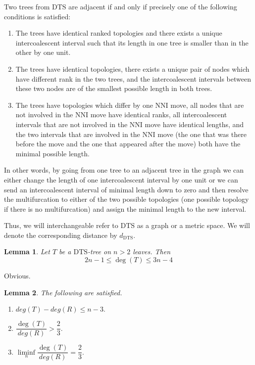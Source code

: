 \documentclass{amsart}
\newtheorem{lemma}{Lemma}
\newcommand{\dts}{\mathrm{DTS}}
\begin{document}
Two trees from $\dts$ are adjacent if and only if precisely one of the following
conditions is satisfied: 

\begin{enumerate}[(1)]
\item The trees have identical ranked topologies and there exists a unique
intercoalescent interval such that its length in one tree is smaller than in the
other by one unit. 
\item The trees have identical topologies, there exists a unique pair of nodes
which have different rank in the two trees, and the intercoalescent intervals 
between these two nodes are of the smallest possible length in both trees. 
\item The trees have topologies which differ by one NNI move, all nodes that
are not involved in the NNI move have identical ranks, all intercoalescent
intervals that are not involved in the NNI move have identical lengths, 
and the two intervals that are involved in the NNI move (the one that was there
before the move and the one that appeared after the move) both have the minimal
possible length.  
\end{enumerate}

In other words, by going from one tree to an adjacent tree in the graph we can
either change the length of one intercoalescent interval by one unit or we
can send an intercoalescent interval of minimal length down to zero and
then resolve the multifurcation to either of the two possible topologies
(one possible topology if there is no multifurcation) and
assign the minimal length to the new interval.

Thus, we will interchangeable refer to $\dts$ as a graph or a metric space. 
We will denote the corresponding distance by $d_\dts$. 

\begin{lemma}
Let $T$ be a $\dts$-tree on $n>2$ leaves. Then \[2n-1\leq \deg(T)\leq3n-4\] 
\end{lemma}

\proof
Obvious. 
\endproof

\begin{lemma} The following are satisfied. 
\begin{enumerate}[(1)]
\item $deg(T)-deg(R) \leq n-3.$
\item $\dfrac{\deg(T)}{deg(R)}>\dfrac23.$
\item $\liminf\limits_n\dfrac{\deg(T)}{deg(R)}=\dfrac23.$
\end{enumerate}
\end{lemma}
\end{document}
